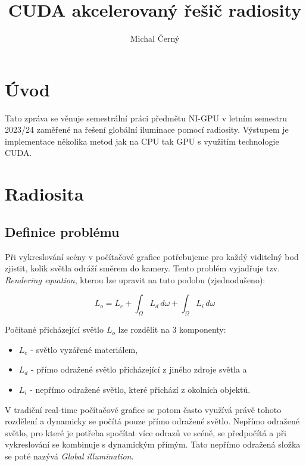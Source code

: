 \documentclass[czech]{pyt-report}
\title{CUDA akcelerovaný řešič radiosity}
\author{Michal Černý}
\affiliation{FIT ČVUT}
\begin{document}
\maketitle

\section{Úvod}
\label{sec:uvod}

Tato zpráva se věnuje semestrální práci předmětu NI-GPU v letním semestru 2023/24 zaměřené na řešení globální iluminace pomocí radiosity. Výstupem je implementace několika metod jak na CPU tak GPU s využitím technologie CUDA.

\section{Radiosita}
\label{sec:radiosita}


\subsection{Definice problému}
\label{sec:radiosita-def}

Při vykreslování scény v počítačové grafice potřebujeme pro každý viditelný bod zjistit, kolik světla odráží směrem do kamery. Tento problém vyjadřuje tzv. \textit{Rendering equation}, kterou lze upravit na tuto podobu (zjednodušeno):

$$ L_o = L_e + \int_\Omega L_d \,d\omega + \int_\Omega L_i \,d\omega $$

Počítané přicházející světlo $L_o$ lze rozdělit na 3 komponenty:

\begin{itemize}
  \item $L_e$ - světlo vyzářené materiálem,
  \item $L_d$ - přímo odražené světlo přicházející z jiného zdroje světla a
  \item $L_i$ - nepřímo odražené světlo, které přichází z okolních objektů.
\end{itemize}

V tradiční real-time počítačové grafice se potom často využívá právě tohoto rozdělení a dynamicky se počítá pouze přímo odražené světlo. Nepřímo odražené světlo, pro které je potřeba spočítat více odrazů ve scéně, se předpočítá a při vykreslování se kombinuje s dynamickým přímým. Tato nepřímo odražená složka se poté nazývá \textit{Global illumination}.
\end{document}
